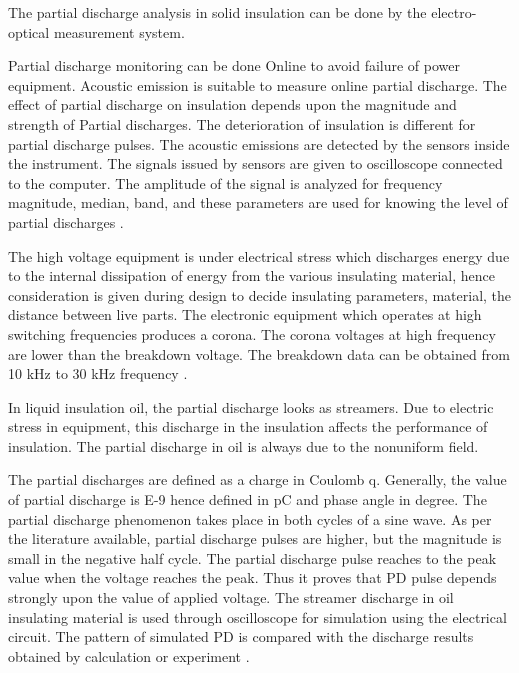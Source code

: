 The partial discharge analysis in solid insulation can be done by the electro-optical measurement system.

Partial discharge monitoring can be done Online to avoid failure of power equipment. Acoustic emission is suitable to measure online partial discharge. The effect of partial discharge on insulation depends upon the magnitude and strength of Partial discharges. The deterioration of insulation is different for partial discharge pulses. The acoustic emissions are detected by the sensors inside the instrument. The signals issued by sensors are given to oscilloscope connected to the computer. The amplitude of the signal is analyzed for frequency magnitude, median, band, and these parameters are used for knowing the level of partial discharges \cite{bengtsson1996status}.

The high voltage equipment is under electrical stress which discharges energy due to the internal dissipation of energy from the various insulating material, hence consideration is given during design to decide insulating parameters, material, the distance between live parts. The electronic equipment which operates at high switching frequencies produces a corona. The corona voltages at high frequency are lower than the breakdown voltage. The breakdown data can be obtained from 10 kHz to 30 kHz frequency \cite{naiduhigh2}.

In liquid insulation oil, the partial discharge looks as streamers. Due to electric stress in equipment, this discharge in the insulation affects the performance of insulation. The partial discharge in oil is always due to the nonuniform field.

 The partial discharges are defined as a charge in Coulomb q. Generally, the value of partial discharge is E-9 hence defined in pC and phase angle in degree. The partial discharge phenomenon takes place in both cycles of a sine wave. As per the literature available, partial discharge pulses are higher, but the magnitude is small in the negative half cycle. The partial discharge pulse reaches to the peak value when the voltage reaches the peak. Thus it proves that PD pulse depends strongly upon the value of applied voltage. The streamer discharge in oil insulating material is used through oscilloscope for simulation using the electrical circuit. The pattern of simulated PD is compared with the discharge results obtained by calculation or experiment \cite{kim2003acoustic, nattrass1993partial, macalpine2002development, kemp1995partial}.
 
